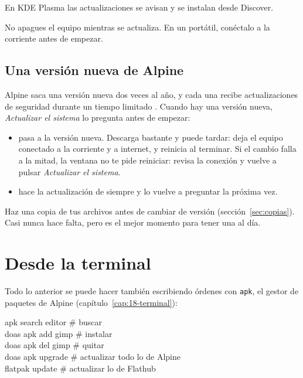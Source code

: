 En KDE Plasma las actualizaciones se avisan y se instalan desde Discover.

\begin{cuidado}
No apagues el equipo mientras se actualiza. En un portátil, conéctalo a
la corriente antes de empezar.
\end{cuidado}

\subsection{Una versión nueva de Alpine}
Alpine saca una versión nueva dos veces al año, y cada una recibe
actualizaciones de seguridad durante un tiempo limitado
\cite{alpine-releases}. Cuando hay una versión nueva, \emph{Actualizar el
sistema} lo pregunta antes de empezar:
\begin{itemize}
  \item {} pasa a la versión nueva. Descarga
        bastante y puede tardar: deja el equipo conectado a la corriente y a
        internet, y reinicia al terminar. Si el cambio falla a la mitad,
        la ventana no te pide reiniciar: revisa la conexión y vuelve a
        pulsar \emph{Actualizar el sistema}.
  \item {} hace la actualización de siempre y lo vuelve
        a preguntar la próxima vez.
\end{itemize}

\begin{consejo}
Haz una copia de tus archivos antes de cambiar de versión
(sección~\ref{sec:copias}). Casi nunca hace falta, pero es el mejor
momento para tener una al día.
\end{consejo}

\section{Desde la terminal}

Todo lo anterior se puede hacer también escribiendo órdenes con
\texttt{apk}, el gestor de paquetes de Alpine (capítulo~\ref{cap:18-terminal}):

\begin{terminal}
apk search editor            \# buscar\\
doas apk add gimp            \# instalar\\
doas apk del gimp            \# quitar\\
doas apk upgrade             \# actualizar todo lo de Alpine\\
flatpak update               \# actualizar lo de Flathub
\end{terminal}

\fuentes

